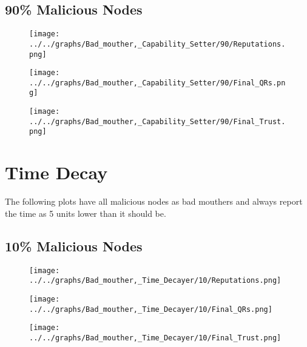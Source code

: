 \begin{minipage}[t]{0.49\columnwidth}
\subsection*{90\% Malicious Nodes}
    \begin{figure}[H]
        \centering
        \texttt{[image: ../../graphs/Bad\_mouther,\_Capability\_Setter/90/Reputations.png]}
    \end{figure}
    \begin{figure}[H]
        \centering
        \texttt{[image: ../../graphs/Bad\_mouther,\_Capability\_Setter/90/Final\_QRs.png]}
    \end{figure}
\end{minipage}
\begin{minipage}[t]{0.49\columnwidth}
    \begin{figure}[H]
        \centering
        \texttt{[image: ../../graphs/Bad\_mouther,\_Capability\_Setter/90/Final\_Trust.png]}
    \end{figure}
\end{minipage}
\newpage

\section*{Time Decay}
The following plots have all malicious nodes as bad mouthers and always
report the time as 5 units lower than it should be.
\\
\begin{minipage}[t]{0.49\columnwidth}
\subsection*{10\% Malicious Nodes}
    \begin{figure}[H]
        \centering
        \texttt{[image: ../../graphs/Bad\_mouther,\_Time\_Decayer/10/Reputations.png]}
    \end{figure}
    \begin{figure}[H]
        \centering
        \texttt{[image: ../../graphs/Bad\_mouther,\_Time\_Decayer/10/Final\_QRs.png]}
    \end{figure}
\end{minipage}
\begin{minipage}[t]{0.49\columnwidth}
    \begin{figure}[H]
        \centering
        \texttt{[image: ../../graphs/Bad\_mouther,\_Time\_Decayer/10/Final\_Trust.png]}
    \end{figure}
\end{minipage}


